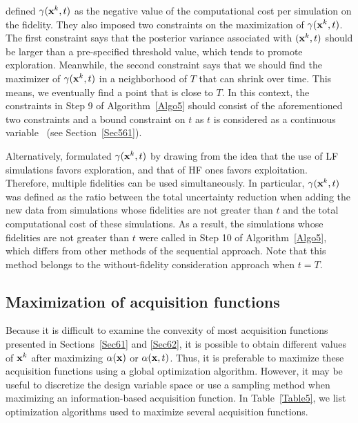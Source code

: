 \documentclass[iicol,sn-basic]{sn-jnl}%
\theoremstyle{thmstyleone}%
\theoremstyle{thmstyletwo}
\theoremstyle{thmstylethree}
\begin{document}
\begin{linenumbers}
\cite{Kandasamy2017} defined $\gamma({\bf x}^k,t)$ as the negative value of the computational cost per simulation on the fidelity.
They also imposed two constraints on the maximization of $\gamma({\bf x}^k,t)$.
The first constraint says that the posterior variance associated with $({\bf x}^k,t)$ should be larger than a pre-specified threshold value, which tends to promote exploration.
Meanwhile, the second constraint says that we should find the maximizer of $\gamma({\bf x}^k,t)$ in a neighborhood of $T$ that can shrink over time.
This means, we eventually find a point that is close to $T$. 
In this context, the constraints in Step 9 of Algorithm~\ref{Algo5} should consist of the aforementioned two constraints and a bound constraint on $t$ as $t$ is considered as a continuous variable~\citep{Kandasamy2017} (see Section~\ref{Sec561}).

Alternatively, \cite{Meliani2019} formulated $\gamma({\bf x}^k,t)$ by drawing from the idea that the use of LF simulations favors exploration, and that of HF ones favors exploitation.
Therefore, multiple fidelities can be used simultaneously.
In particular, $\gamma({\bf x}^k,t)$ was defined as the ratio between the total uncertainty reduction when adding the new data from simulations whose fidelities are not greater than $t$ and the total computational cost of these simulations.
As a result, the simulations whose fidelities are not greater than $t$ were called in Step 10 of Algorithm~\ref{Algo5}, which differs from other methods of the sequential approach.
Note that this method belongs to the without-fidelity consideration approach when $t=T$.

\subsection{Maximization of acquisition functions}\label{Sec63}

Because it is difficult to examine the convexity of most acquisition functions presented in Sections~\ref{Sec61} and \ref{Sec62}, it is possible to obtain different values of ${\bf x}^k$ after maximizing $\alpha({\bf x})$ or $\alpha({\bf x},t)$. 
Thus, it is preferable to maximize these acquisition functions using a global optimization algorithm.
However, it may be useful to discretize the design variable space or use a sampling method when maximizing an information-based acquisition function.
In Table~\ref{Table5}, we list optimization algorithms used to maximize several acquisition functions.


\end{linenumbers}
\end{document}
